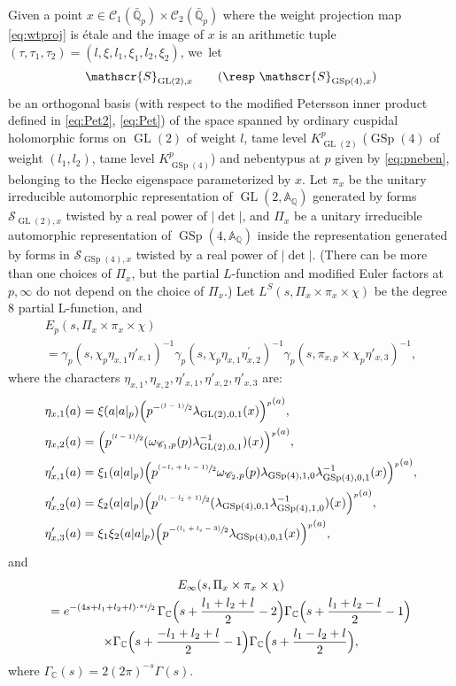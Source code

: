 \documentclass[JEP,XML,SOM,Unicode,published]{cedram}
\newcommand{\NoChangel}[1]{%
\expandafter\let\csname old\string#1\endcsname=#1
\let#1=\relax
\newcommand{#1}{\mathop{\mathcode`l="716C\csname old\string#1\endcsname\mathcode`l="7160}\displaylimits}%
}
\newcommand{\psfrac}[2]{\sfrac{(#1)}{#2}}
\newcommand{\Lfunction}{$L$\nobreakdash-func\-tion\xspace}
\theoremstyle{plain}
\theoremstyle{remark}
\newcommand{\bA}{\mathbb{A}}
\newcommand{\bC}{\mathbb{C}}
\newcommand{\bQ}{\mathbb{Q}}
\newcommand{\sC}{\mathscr{C}}
\newcommand{\sS}{\mathscr{S}}
\DeclareMathOperator{\GL}{GL}
\DeclareMathOperator{\GSp}{GSp}
\newcommand{\val}{\mathrm{val}}\NoChangel{\val}
\begin{document}
Given a point $x\in \sC_1(\bar{\bQ}_p)\times\sC_2(\bar{\bQ}_p)$ where the weight projection map \eqref{eq:wtproj} is \'{e}tale and the image of $x$ is an arithmetic tuple $(\tau,\tau_1,\tau_2)=(l,\xi,l_1,\xi_1,l_2,\xi_2)$, we~let
\begin{align*}
\sS_{\GL(2),x}\qquad\text{(\resp $\sS_{\GSp(4),x}$)}
\end{align*}
be an orthogonal basis (with respect to the modified Petersson inner product defined in \eqref{eq:Pet2}, \eqref{eq:Pet}) of the space spanned by ordinary cuspidal holomorphic forms on $\GL(2)$ of weight $l$, tame level $K^p_{\GL(2)}$ (\resp $\GSp(4)$ of weight $(l_1,l_2)$, tame level $K^p_{\GSp(4)}$) and nebentypus at $p$ given by \eqref{eq:pneben}, belonging to the Hecke eigenspace parameterized by $x$. Let $\pi_x$ be the unitary irreducible automorphic representation of $\GL(2,\bA_\bQ)$ generated by forms $\sS_{\GL(2),x}$ twisted by a real power of $|\det|$, and $\Pi_x$ be a unitary irreducible automorphic representation of $\GSp(4,\bA_\bQ)$ inside the representation generated by forms in $\sS_{\GSp(4),x}$ twisted by a real power of $|\det|$. (There can be more than one choices of $\Pi_x$, but the partial \Lfunction and modified Euler factors at $p,\infty$ do not depend on the choice of $\Pi_x$.) Let $L^S(s,\Pi_x\times\pi_x\times\chi)$ be the degree $8$ partial L-function, and
\begin{multline} \label{eq:Ep}
E_p(s,\Pi_x\times\pi_x\times\chi)\\
=\gamma_p(s,\chi_p\eta_{x,1}\eta'_{x,1})^{-1} \gamma_p(s,\chi_p\eta_{x,1}\eta^{\prime}_{x,2})^{-1}
\gamma_p(s,\pi_{x,p}\times\chi_p\eta'_{x,3})^{-1},
\end{multline}
where the characters $\eta_{x,1},\eta_{x,2},\eta'_{x,1},\eta'_{x,2},\eta'_{x,3}$ are:
\begin{equation}\label{eq:etas}
\begin{aligned}
\eta_{x,1}(a)&=\xi(a|a|_p) \Bigl(p^{-\psfrac{l-1}{2}}\lambda_{\GL(2),0,1}(x)\Bigr)^{\val_p(a)},\\
\eta_{x,2}(a)&=\Bigl(p^{\psfrac{l-1}{2}}(\omega_{\sC_1,p}(p)\lambda^{-1}_{\GL(2),0,1})(x)\Bigr)^{\val_p(a)},\\
\eta'_{x,1}(a)&=\xi_1(a|a|_p)\Bigl(p^{\psfrac{-l_1+l_2-1}{2}} \omega_{\sC_2,p}(p)\lambda_{\GSp(4),1,0}\lambda_{\GSp(4),0,1}^{-1}(x)\Bigr)^{\val_p(a)},\\
\eta'_{x,2}(a)&=\xi_2(a|a|_p)\Bigl(p^{\psfrac{l_1-l_2+1}{2}} (\lambda_{\GSp(4),0,1}\lambda_{\GSp(4),1,0}^{-1})(x)\Bigr)^{\val_p(a)},\\
\eta'_{x,3}(a)&=\xi_1\xi_2(a|a|_p)\Bigl(p^{-\psfrac{l_1+l_2-3}{2}}\lambda_{\GSp(4),0,1}(x)\Bigr)^{\val_p(a)},
\end{aligned}
\end{equation}
and
\begin{multline}\label{eq:Einf}
E_\infty(s,\Pi_x\times\pi_x\times\chi)\\
=e^{-(4s+l_1+l_2+l)\cdot \sfrac{\pi i}{2}}\,\Gamma_\bC\Bigl(s+\frac{l_1+l_2+l}{2}-2\Bigr)\Gamma_\bC\Bigl(s+\frac{l_1+l_2-l}{2}-1\Bigr)\\
\times\Gamma_\bC\Bigl(s+\frac{-l_1+l_2+l}{2}-1\Bigr)\Gamma_\bC\Bigl(s+\frac{l_1-l_2+l}{2}\Bigr),
\end{multline}
where $\Gamma_\bC(s)=2(2\pi)^{-s}\Gamma(s)$.
\end{document}
